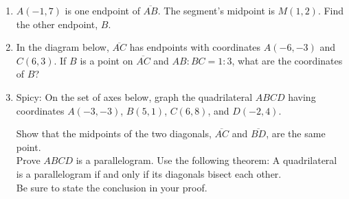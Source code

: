 \begin{enumerate}
\item $A(-1,7)$ is one endpoint of $\overline{AB}$. The segment's midpoint is $M(1,2)$. Find the other endpoint, $B$.  \vspace{4cm}

\item In the diagram below, $\overline{AC}$ has endpoints with coordinates $A(-6,-3)$ and $C(6, 3)$. If $B$ is a point on $\overline{AC}$ and $AB {:} BC = 1{:}3$,  what  are  the coordinates of $B$?
  \begin{flushright} %
  \end{flushright}
  

\newpage
\item Spicy: On the set of axes below, graph the quadrilateral $ABCD$ having coordinates $A(-3,-3)$, $B(5,1)$, $C(6,8)$, and $D(-2,4)$.
  \begin{center} %
  \end{center}
  Show that the midpoints of the two diagonals, $\overline{AC}$ and $\overline{BD}$, are the same point. \\[5cm]
  Prove $ABCD$ is a parallelogram. Use the following theorem:
  A quadrilateral is a parallelogram if and only if its diagonals bisect each other. \\[0.5cm]
  Be sure to state the conclusion in your proof.

  
\end{enumerate}
